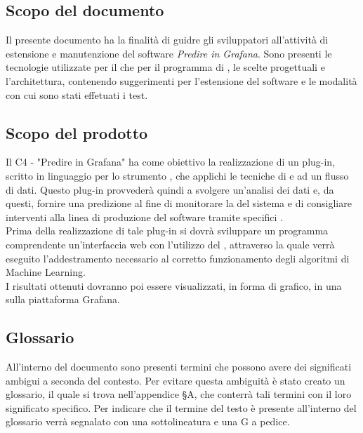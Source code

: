 \documentclass[../manuale-sviluppatore.tex]{subfiles}
\begin{document}
\subsection{Scopo del documento}%
\label{subs:scopo_del_documento}
Il presente documento ha la finalità di guidre gli sviluppatori all'attività di estensione e manutenzione del software \emph{Predire in Grafana}. Sono presenti le tecnologie utilizzate per il  che per il programma di , le scelte progettuali e l'architettura, contenendo suggerimenti per l'estensione del software e le modalità con cui sono stati effetuati i test.

\subsection{Scopo del prodotto}%
\label{subs:scopo_del_prodotto}
Il  C4 - "Predire in Grafana" ha come obiettivo la realizzazione di un plug-in, scritto in linguaggio  per lo strumento  , che applichi le tecniche di   e  ad un flusso di dati. Questo plug-in provvederà quindi a svolgere un'analisi dei dati e, da questi, fornire una predizione al fine di monitorare la  del sistema e di consigliare interventi alla linea di produzione del software tramite specifici . \\
Prima della realizzazione di tale plug-in si dovrà sviluppare un programma comprendente un'interfaccia web con l'utilizzo del  , attraverso la quale verrà eseguito l'addestramento necessario al corretto funzionamento degli algoritmi di Machine Learning. \\
I risultati ottenuti dovranno poi essere visualizzati, in forma di grafico, in una  sulla piattaforma Grafana.

\subsection{Glossario}
\label{subs:glossario}
All'interno del documento sono presenti termini che possono avere dei significati ambigui a seconda del contesto. Per evitare questa ambiguità è stato creato un glossario, il quale si trova nell'appendice §A, che conterrà tali termini con il loro significato specifico. Per indicare che il termine del testo è presente all'interno del glossario verrà segnalato con una sottolineatura e una G a pedice.
\end{document}
